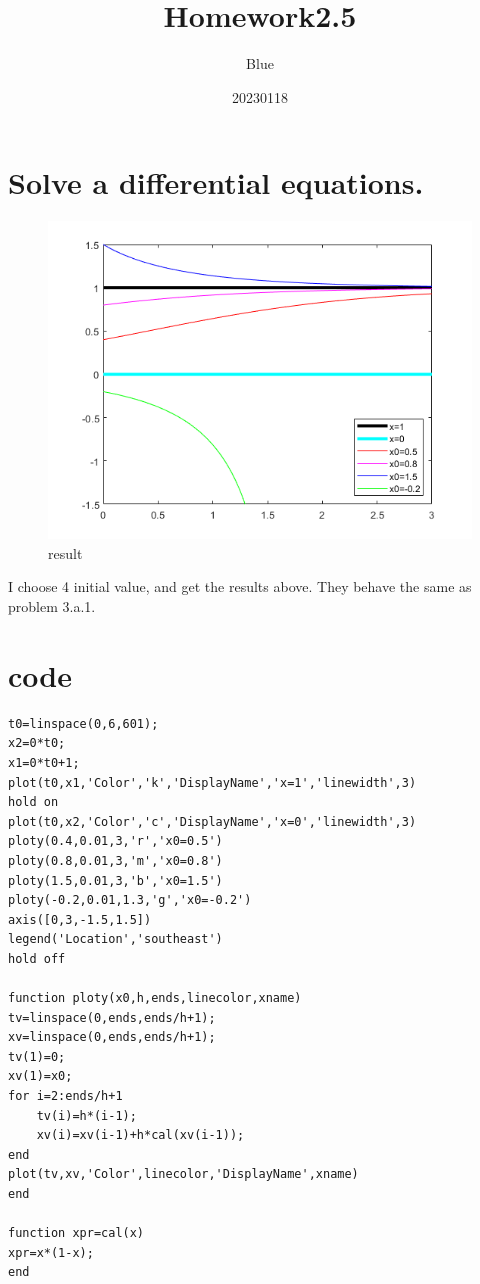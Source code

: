 \documentclass{article}
\title{Homework2.5}
\author{Blue}
\date{20230118}
\begin{document}
\maketitle
\section{Solve a differential equations.}
\begin{figure}[H]
\centering
\includegraphics{results.png}
\caption{result}
\end{figure}
I choose 4 initial value, and get the results above. They behave the same as problem 3.a.1.
\section{code}
\begin{lstlisting}
t0=linspace(0,6,601);
x2=0*t0;
x1=0*t0+1;
plot(t0,x1,'Color','k','DisplayName','x=1','linewidth',3)
hold on
plot(t0,x2,'Color','c','DisplayName','x=0','linewidth',3)
ploty(0.4,0.01,3,'r','x0=0.5')
ploty(0.8,0.01,3,'m','x0=0.8')
ploty(1.5,0.01,3,'b','x0=1.5')
ploty(-0.2,0.01,1.3,'g','x0=-0.2')
axis([0,3,-1.5,1.5])
legend('Location','southeast')
hold off

function ploty(x0,h,ends,linecolor,xname)
tv=linspace(0,ends,ends/h+1);
xv=linspace(0,ends,ends/h+1);
tv(1)=0;
xv(1)=x0;
for i=2:ends/h+1
    tv(i)=h*(i-1);
    xv(i)=xv(i-1)+h*cal(xv(i-1));
end
plot(tv,xv,'Color',linecolor,'DisplayName',xname)
end

function xpr=cal(x)
xpr=x*(1-x);
end
\end{lstlisting}
\end{document}
